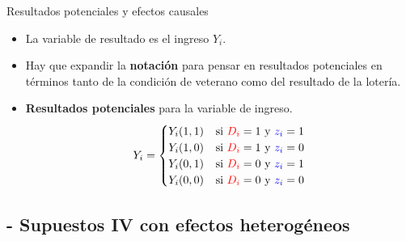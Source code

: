 \documentclass[10pt, xcolor=dvipsnames]{beamer}
\begin{document}
\begin{frame}{Resultados potenciales y efectos causales}
\begin{itemize}
	\item La variable de resultado es el ingreso $Y_i$.
	\item Hay que expandir la \textbf{notación} para pensar en resultados potenciales en términos tanto de la condición de veterano como del resultado de la lotería.
		\item \textbf{Resultados potenciales} para la variable de ingreso.
	\begin{align*}
	Y_i = 
		\begin{cases}
		Y_i(1,1) &\hspace{0.5pt} \text{si $\textcolor{red}{D_i}=1$ y $\textcolor{blue}{z_i} =1$}\\
		Y_i(1,0) &\hspace{0.5pt} \text{si $\textcolor{red}{D_i}=1$ y $\textcolor{blue}{z_i} =0$}\\
		Y_i(0,1) &\hspace{0.5pt} \text{si $\textcolor{red}{D_i}=0$ y $\textcolor{blue}{z_i} =1$}\\
		Y_i(0,0) &\hspace{0.5pt} \text{si $\textcolor{red}{D_i}=0$ y $\textcolor{blue}{z_i} =0$}
		\end{cases}
	\end{align*}	
\end{itemize}
\end{frame}


\subsection{- Supuestos IV con efectos heterogéneos}
\end{document}
